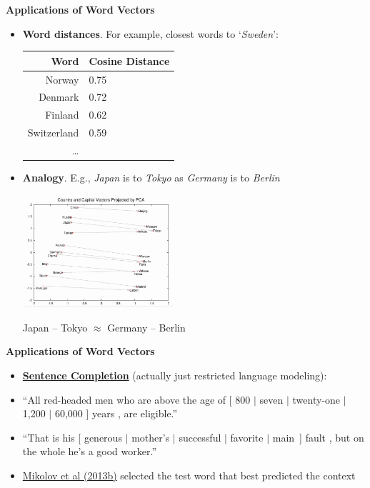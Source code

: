 \documentclass{beamer}
\newcommand{\pagestepalt}[2]{
  \begin{frame}[t]
    \begin{minipage}[t][0.26\textheight][t]{\textwidth}
      \begin{center}
        \huge
        \textbf{#1}
      \end{center}
    \end{minipage}
    
    \begin{minipage}[t][0.7\textheight][c]{\textwidth}
      #2
    \end{minipage}
  \end{frame}
}
\begin{document}
\pagestepalt{Applications of Word Vectors}{
  \vspace{-1.5cm}
  \begin{itemize}
	\item \textbf{Word distances}.  For example, closest words to `\textit{Sweden}':
		\begin{center}
		\begin{footnotesize}
		\begin{tabular}{rl}
			\bf Word & \bf Cosine Distance \\
			\hline
			Norway & 0.75 \\
			Denmark & 0.72 \\
			Finland & 0.62 \\
			Switzerland & 0.59 \\
			\ldots & \\
		\end{tabular}
		\end{footnotesize}
		\end{center}
		\pause
	\item \textbf{Analogy}.  E.g., \textit{Japan} is to \textit{Tokyo} as \textit{Germany} is to \textit{Berlin}
		\begin{center}
		\includegraphics[width=0.44\textwidth]{../images/countries_capitals.png}
		\end{center}
		\pause
		{\scriptsize Japan -- Tokyo $\approx$ Germany -- Berlin }
\end{itemize}
}


\pagestepalt{Applications of Word Vectors}{
\begin{itemize}
	\item \textbf{\href{http://research.microsoft.com/en-us/um/people/cburges/tech_reports/msr-tr-2011-129.pdf}{Sentence Completion}} (actually just restricted language modeling):
	\item ``All red-headed men who are above the age of {\color{darkblue} [ 800 $|$ seven $|$ twenty-one $|$ 1,200 $|$ 60,000 ]} years , are eligible.''
	\item ``That is his {\color{darkblue} [ generous $|$ mother's $|$ successful $|$ favorite $|$ main~]} fault , but on the whole he's a good worker.''
	\pause
	\item \href{http://arxiv.org/pdf/1301.3781.pdf}{Mikolov et al (2013b)} selected the test word that best predicted the context
\end{itemize}
}
\end{document}
